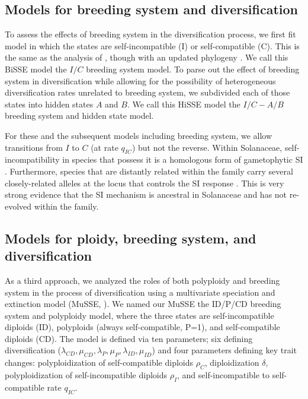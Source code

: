 \subsection{Models for breeding system and diversification}

To assess the effects of breeding system in the diversification process, we first fit model in which the states are self-incompatible (I) or self-compatible (C).
This is the same as the analysis of \citet{goldberg_2010}, though with an updated phylogeny \citep{sarkinen_2013}.
We call this BiSSE model the $I/C$ breeding system model. 
To parse out the effect of breeding system in diversification while allowing for the possibility of heterogeneous diversification rates unrelated to breeding system, we subdivided each of those states into hidden states $A$ and $B$.
We call this HiSSE model the $I/C-A/B$ breeding system and hidden state model. 

For these and the subsequent models including breeding system, we allow transitions from $I$ to $C$ (at rate $q_{IC}$) but not the reverse.
Within Solanaceae, self-incompatibility in species that possess it is a homologous form of gametophytic SI \citep[shared even shared even with other dicot families;][]{igic_2001, steinbachs_2002}.
Furthermore, species that are distantly related within the family carry several closely-related alleles at the locus that controls the SI response \citep{ioerger_1990, igic_2006}.
This is very strong evidence that the SI mechanism is ancestral in Solanaceae and has not re-evolved within the family.

\subsection{Models for ploidy, breeding system, and diversification}

As a third approach, we analyzed the roles of both polyploidy and breeding system in the process of diversification using a multivariate speciation and extinction model (MuSSE, \citet{fitzjohn_2012}).  We named our MuSSE the ID/P/CD breeding system and polyploidy model, where the three states are self-incompatible diploids (ID), polyploids (always self-compatible, P=1), and self-compatible diploids (CD). The model is defined via ten parameters; six defining diversification ($\lambda_{CD}, \mu_{CD},\lambda_{P},\mu_{P}, \lambda_{ID},\mu_{ID}$) and  four parameters defining key trait changes: polyploidization of self-compatible diploids $\rho_{C}$, diploidization $\delta$, polyploidization of self-incompatible diploids $\rho_{I}$, and self-incompatible to self-compatible rate $q_{IC}$.

